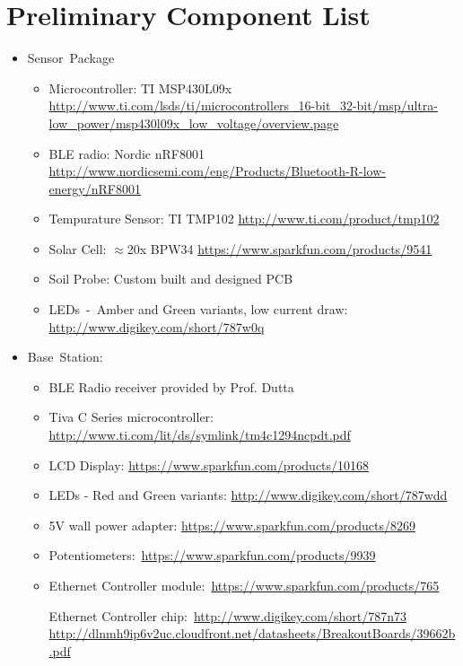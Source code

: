 \documentclass{article}
\begin{document}
\section{Preliminary Component List}
\begin{itemize}
    \item Sensor Package
        \begin{itemize}
            \item Microcontroller: TI MSP430L09x
                \url{http://www.ti.com/lsds/ti/microcontrollers_16-bit_32-bit/msp/ultra-low_power/msp430l09x_low_voltage/overview.page}
            \item BLE radio: Nordic nRF8001
                \url{http://www.nordicsemi.com/eng/Products/Bluetooth-R-low-energy/nRF8001}
            \item Tempurature Sensor: TI TMP102
                \url{http://www.ti.com/product/tmp102}
            \item Solar Cell: $\approx$20x BPW34
                \url{https://www.sparkfun.com/products/9541}
            \item Soil Probe: Custom built and designed PCB
            \item LEDs - Amber and Green variants, low current draw:
                \url{http://www.digikey.com/short/787w0q}
        \end{itemize}
    \item Base Station: 
        \begin{itemize}
            \item BLE Radio receiver provided by Prof. Dutta
            \item Tiva C Series microcontroller:
                \url{http://www.ti.com/lit/ds/symlink/tm4c1294ncpdt.pdf}
            \item LCD Display: \url{https://www.sparkfun.com/products/10168}
            \item
                LEDs - Red and Green variants:
                \url{http://www.digikey.com/short/787wdd}
            \item 5V wall power adapter:
                \url{https://www.sparkfun.com/products/8269}
            \item Potentiometers: \url{https://www.sparkfun.com/products/9939}
            \item
                Ethernet Controller module: \url{https://www.sparkfun.com/products/765}

                Ethernet Controller chip: \url{http://www.digikey.com/short/787n73}
                \url{http://dlnmh9ip6v2uc.cloudfront.net/datasheets/BreakoutBoards/39662b.pdf}
        \end{itemize}
\end{itemize}
\end{document}
